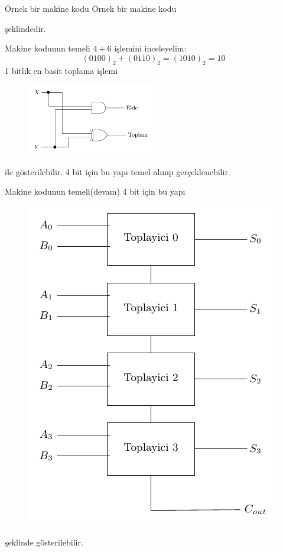 \begin{frame}[fragile]{Örnek bir makine kodu}
    Örnek bir makine kodu
    
    şeklindedir.
\end{frame}
\begin{frame}[fragile]{Makine kodunun temeli}
    $4+6$ işlemini inceleyelim:
    \begin{equation}
        (0100)_2+(0110)_2=(1010)_2=10
    \end{equation}
    1 bitlik en basit toplama işlemi 
    \begin{figure}[!htb]
        \centering
        \includegraphics[width=0.5\textwidth]{lec1/xor}
    \end{figure}
    ile gösterilebilir. 4 bit için bu yapı temel alınıp gerçeklenebilir.
\end{frame}
\begin{frame}[fragile]{Makine kodunun temeli(devam)}
    4 bit için bu yapı 
    \begin{figure}[!htb]
        \centering
        \includegraphics[height=0.6\textheight]{lec1/fulladder}
    \end{figure}
    şeklinde gösterilebilir.
\end{frame}
